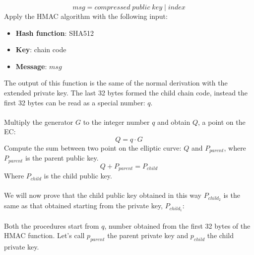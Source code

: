\begin{equation*}
msg = compressed \; public\;key \;|\; index
\end{equation*}
Apply the HMAC algorithm with the following input:

\begin{itemize}[label=$\odot$]
	\item \textbf{Hash function}: SHA512
	\item \textbf{Key}: chain code
	\item \textbf{Message}: $msg$
\end{itemize}
The output of this function is the same of the normal derivation with the extended private key. The last 32 bytes formed the child chain code, instead the first 32 bytes can be read as a special number: $q$. \\ \\
Multiply the generator $G$ to the integer number $q$ and obtain $Q$, a point on the EC:
\begin{equation*}
Q=q\cdot G
\end{equation*}
Compute the sum between two point on the elliptic curve: $Q$ and $P_{parent}$, where $P_{parent}$ is the parent public key.
\begin{equation*}
Q+P_{parent}=P_{child}
\end{equation*}
Where $P_{child}$ is the child public key. 
\\ \\
We will now prove that the child public key obtained in this way $P_{child_2}$ is the same as that obtained starting from the private key, $P_{child_1}$:
\\ \\
Both the procedures start from $q$, number obtained from the first 32 bytes of the HMAC function. Let's call $p_{parent}$ the parent private key and $p_{child}$ the child private key.

